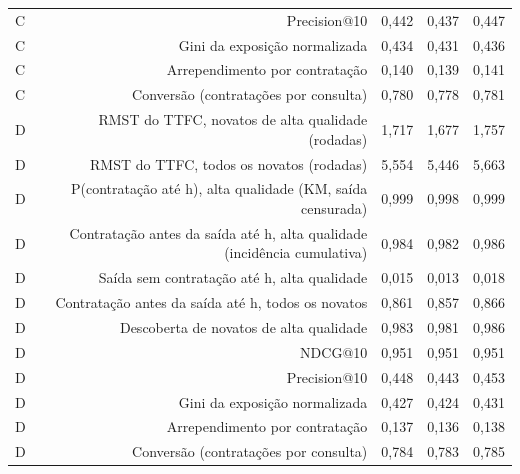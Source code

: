 \begin{table}[ht]
\begin{tabular}{lrrrr}
C & Precision@10 & 0,442 & 0,437 & 0,447 \\
C & Gini da exposição normalizada & 0,434 & 0,431 & 0,436 \\
C & Arrependimento por contratação & 0,140 & 0,139 & 0,141 \\
C & Conversão (contratações por consulta) & 0,780 & 0,778 & 0,781 \\
D & RMST do TTFC, novatos de alta qualidade (rodadas) & 1,717 & 1,677 & 1,757 \\
D & RMST do TTFC, todos os novatos (rodadas) & 5,554 & 5,446 & 5,663 \\
D & P(contratação até h), alta qualidade (KM, saída censurada) & 0,999 & 0,998 & 0,999 \\
D & Contratação antes da saída até h, alta qualidade (incidência cumulativa) & 0,984 & 0,982 & 0,986 \\
D & Saída sem contratação até h, alta qualidade & 0,015 & 0,013 & 0,018 \\
D & Contratação antes da saída até h, todos os novatos & 0,861 & 0,857 & 0,866 \\
D & Descoberta de novatos de alta qualidade & 0,983 & 0,981 & 0,986 \\
D & NDCG@10 & 0,951 & 0,951 & 0,951 \\
D & Precision@10 & 0,448 & 0,443 & 0,453 \\
D & Gini da exposição normalizada & 0,427 & 0,424 & 0,431 \\
D & Arrependimento por contratação & 0,137 & 0,136 & 0,138 \\
D & Conversão (contratações por consulta) & 0,784 & 0,783 & 0,785 \\
\hline
\end{tabular}
\end{table}
